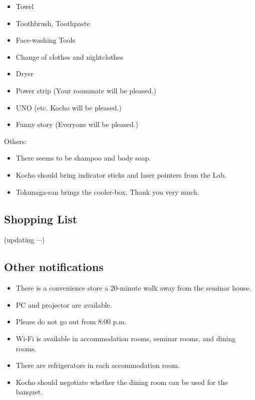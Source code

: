 \documentclass[unicode,a4paper,11pt]{ltjsarticle}
\begin{document}
\begin{itemize}
  \item
        Towel
  \item
        Toothbrush, Toothpaste
  \item
        Face-washing Tools
  \item
        Change of clothes and nightclothes
  \item
        Dryer
  \item
        Power strip (Your roommate will be pleased.)
  \item
        UNO (etc. Kocho will be pleased.)
  \item
        Funny story (Everyone will be pleased.)
\end{itemize}

Others:
\begin{itemize}
  \item
        There seems to be shampoo and body soap.
  \item
        Kocho should bring indicator sticks and laser pointers from the Lab.
  \item
        Tokunaga-san brings the cooler-box. Thank you very much.
\end{itemize}


\subsection*{Shopping List}

(updating $\cdots$)


\subsection*{Other notifications}

\begin{itemize}
  \item
        There is a convenience store a 20-minute walk away from the seminar house.
  \item
        PC and projector are available.
  \item
        Please do not go out from 8:00 p.m.
  \item
        Wi-Fi is available in accommodation rooms, seminar rooms, and dining rooms.
  \item
        There are refrigerators in each accommodation room.
  \item
        Kocho should negotiate whether the dining room can be used for the banquet.
\end{itemize}
\end{document}
